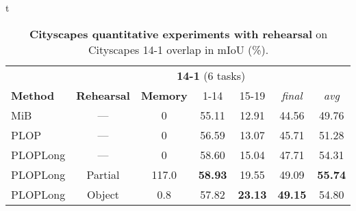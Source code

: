 t\begin{table}[t]
    \centering
    \begin{adjustbox}{max width=\textwidth}
        \begin{tabular}{@{}l|cc|cccc@{}}
            \toprule
                                                          & \multicolumn{6}{c}{\textbf{14-1} (6 tasks)}                                                                                       \\
            \textbf{Method}                               & \textbf{Rehearsal}                          & \textbf{Memory} & 1-14           & 15-19          & \textit{final} & \textit{avg}   \\
            \midrule
            MiB \citep{cermelli2020modelingthebackground} & ---                                         & 0               & 55.11          & 12.91          & 44.56          & 49.76          \\
            PLOP                                          & ---                                         & 0               & 56.59          & 13.07          & 45.71          & 51.28          \\
            PLOPLong                                      & ---                                         & 0               & 58.60          & 15.04          & 47.71          & 54.31          \\
            PLOPLong                                      & Partial                                     & 117.0           & \textbf{58.93} & 19.55          & 49.09          & \textbf{55.74} \\
            PLOPLong                                      & Object                                      & 0.8             & 57.82          & \textbf{23.13} & \textbf{49.15} & 54.80          \\
            \bottomrule
        \end{tabular}
    \end{adjustbox}
    \caption{\textbf{Cityscapes quantitative experiments with rehearsal} on Cityscapes 14-1 overlap in \ac{mIoU} (\%).}
    \label{tab:seg_cityscapes_rehearsal}
\end{table}
